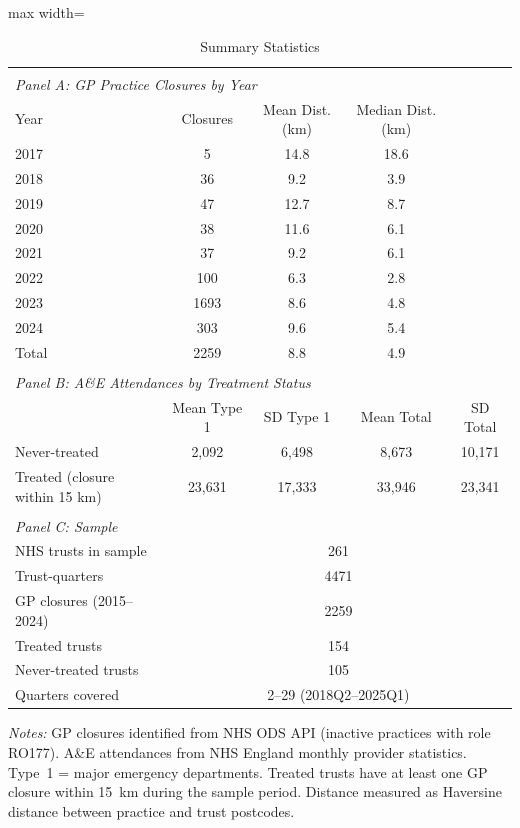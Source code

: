 \begin{table}[t]
\centering
\caption{Summary Statistics}
\label{tab:summary}
\begin{adjustbox}{max width=\textwidth}
\begin{tabular}{lcccc}
\hline\hline
\\[-1.8ex]
\multicolumn{5}{l}{\textit{Panel A: GP Practice Closures by Year}} \\
\hline
Year & Closures & Mean Dist. (km) & Median Dist. (km) & \\
\hline
2017 & 5 & 14.8 & 18.6 & \\
2018 & 36 & 9.2 & 3.9 & \\
2019 & 47 & 12.7 & 8.7 & \\
2020 & 38 & 11.6 & 6.1 & \\
2021 & 37 & 9.2 & 6.1 & \\
2022 & 100 & 6.3 & 2.8 & \\
2023 & 1693 & 8.6 & 4.8 & \\
2024 & 303 & 9.6 & 5.4 & \\
Total & 2259 & 8.8 & 4.9 & \\
\hline
\\[-1.8ex]
\multicolumn{5}{l}{\textit{Panel B: A\&E Attendances by Treatment Status}} \\
\hline
 & Mean Type 1 & SD Type 1 & Mean Total & SD Total \\
\hline
Never-treated & 2,092 & 6,498 & 8,673 & 10,171 \\
Treated (closure within 15 km) & 23,631 & 17,333 & 33,946 & 23,341 \\
\hline
\\[-1.8ex]
\multicolumn{5}{l}{\textit{Panel C: Sample}} \\
\hline
NHS trusts in sample & \multicolumn{4}{c}{261} \\
Trust-quarters & \multicolumn{4}{c}{4471} \\
GP closures (2015--2024) & \multicolumn{4}{c}{2259} \\
Treated trusts & \multicolumn{4}{c}{154} \\
Never-treated trusts & \multicolumn{4}{c}{105} \\
Quarters covered & \multicolumn{4}{c}{2--29 (2018Q2--2025Q1)} \\
\hline\hline
\end{tabular}
\end{adjustbox}
\begin{tablenotes}
\small
\item \textit{Notes:} GP closures identified from NHS ODS API (inactive practices with role RO177). A\&E attendances from NHS England monthly provider statistics. Type~1 = major emergency departments. Treated trusts have at least one GP closure within 15~km during the sample period. Distance measured as Haversine distance between practice and trust postcodes.
\end{tablenotes}
\end{table}
